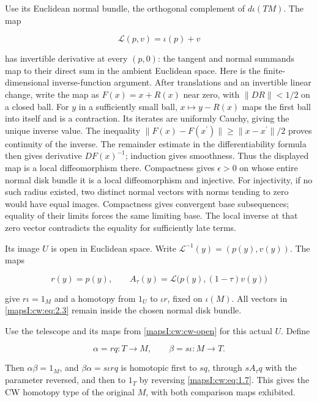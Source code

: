 Use its Euclidean normal bundle, the orthogonal complement of \(d\iota(TM)\). The map

\begin{equation}
\mathcal L(p,v)=\iota(p)+v
\label{mapsI:cw:eq:2.2}
\end{equation}

has invertible derivative at every \((p,0)\): the tangent and normal summands map to their direct sum in the ambient Euclidean space. Here is the finite-dimensional inverse-function argument. After translations and an invertible linear change, write the map as \(F(x)=x+R(x)\) near zero, with \(\|DR\|<1/2\) on a closed ball. For \(y\) in a sufficiently small ball, \(x\mapsto y-R(x)\) maps the first ball into itself and is a contraction. Its iterates are uniformly Cauchy, giving the unique inverse value. The inequality \(\|F(x)-F(x^{\prime})\|\ge\|x-x^{\prime}\|/2\) proves continuity of the inverse. The remainder estimate in the differentiability formula then gives derivative \(DF(x)^{-1}\); induction gives smoothness. Thus the displayed map is a local diffeomorphism there. Compactness gives \(\epsilon>0\) on whose entire normal disk bundle it is a local diffeomorphism and injective. For injectivity, if no such radius existed, two distinct normal vectors with norms tending to zero would have equal images. Compactness gives convergent base subsequences; equality of their limits forces the same limiting base. The local inverse at that zero vector contradicts the equality for sufficiently late terms.

Its image \(U\) is open in Euclidean space. Write \(\mathcal L^{-1}(y)=(p(y),v(y))\). The maps

\begin{equation}
r(y)=p(y),\qquad
A_\tau(y)=\mathcal L\bigl(p(y),(1-\tau)v(y)\bigr)
\label{mapsI:cw:eq:2.3}
\end{equation}

give \(r\iota=1_M\) and a homotopy from \(1_U\) to \(\iota r\), fixed on \(\iota(M)\). All vectors in \eqref{mapsI:cw:eq:2.3} remain inside the chosen normal disk bundle.

Use the telescope and its maps from \cref{mapsI:cw:cw-open} for this actual \(U\). Define

\begin{equation}
\alpha=r q:T\longrightarrow M,\qquad
\beta=s\iota:M\longrightarrow T.
\label{mapsI:cw:eq:2.4}
\end{equation}

Then \(\alpha\beta=1_M\), and \(\beta\alpha=s\iota r q\) is homotopic first to \(s q\), through \(s A_\tau q\) with the parameter reversed, and then to \(1_T\) by reversing \eqref{mapsI:cw:eq:1.7}. This gives the CW homotopy type of the original \(M\), with both comparison maps exhibited.

